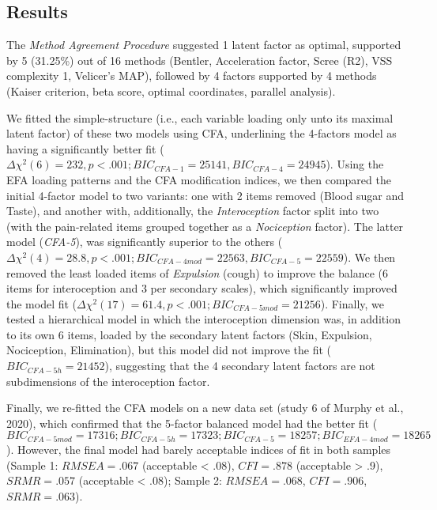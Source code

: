 \documentclass[
  man,floatsintext]{apa6}
\begin{document}
\hypertarget{results}{%
\subsection{Results}\label{results}}

The \emph{Method Agreement Procedure} suggested 1 latent factor as optimal, supported by 5 (31.25\%) out of 16 methods (Bentler, Acceleration factor, Scree (R2), VSS complexity 1, Velicer's MAP), followed by 4 factors supported by 4 methods (Kaiser criterion, beta score, optimal coordinates, parallel analysis).

We fitted the simple-structure (i.e., each variable loading only unto its maximal latent factor) of these two models using CFA, underlining the 4-factors model as having a significantly better fit (\(\Delta \chi^2(6) = 232, p < .001; BIC_{CFA-1} = 25141, BIC_{CFA-4} = 24945\)). Using the EFA loading patterns and the CFA modification indices, we then compared the initial 4-factor model to two variants: one with 2 items removed (Blood sugar and Taste), and another with, additionally, the \emph{Interoception} factor split into two (with the pain-related items grouped together as a \emph{Nociception} factor). The latter model (\emph{CFA-5}), was significantly superior to the others (\(\Delta \chi^2(4) = 28.8, p < .001; BIC_{CFA-4mod} = 22563, BIC_{CFA-5} = 22559\)). We then removed the least loaded items of \emph{Expulsion} (cough) to improve the balance (6 items for interoception and 3 per secondary scales), which significantly improved the model fit (\(\Delta \chi^2(17) = 61.4, p < .001; BIC_{CFA-5mod} = 21256\)). Finally, we tested a hierarchical model in which the interoception dimension was, in addition to its own 6 items, loaded by the secondary latent factors (Skin, Expulsion, Nociception, Elimination), but this model did not improve the fit (\(BIC_{CFA-5h} = 21452\)), suggesting that the 4 secondary latent factors are not subdimensions of the interoception factor.

Finally, we re-fitted the CFA models on a new data set (study 6 of Murphy et al., 2020), which confirmed that the 5-factor balanced model had the better fit (\(BIC_{CFA-5mod} = 17316; BIC_{CFA-5h} = 17323; BIC_{CFA-5} = 18257; BIC_{EFA-4mod} = 18265\)). However, the final model had barely acceptable indices of fit in both samples (Sample 1: \(RMSEA = .067\) (acceptable \textless{} .08), \(CFI = .878\) (acceptable \textgreater{} .9), \(SRMR = .057\) (acceptable \textless{} .08); Sample 2: \(RMSEA = .068\), \(CFI = .906\), \(SRMR = .063\)).
\end{document}
